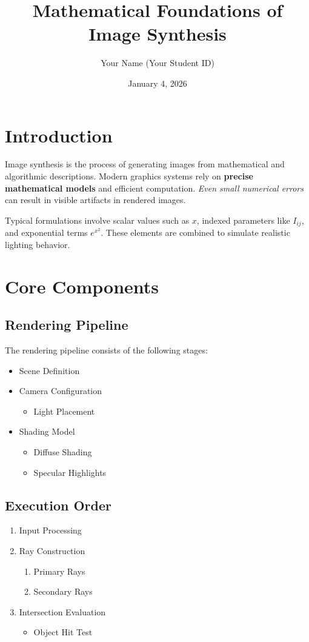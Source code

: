 \documentclass[11pt]{article}
\title{Mathematical Foundations of Image Synthesis}
\author{Your Name (Your Student ID)}
\date{January 4, 2026}
\begin{document}
\maketitle

\section{Introduction}
Image synthesis is the process of generating images from mathematical and
algorithmic descriptions. Modern graphics systems rely on \textbf{precise
mathematical models} and efficient computation. \textit{Even small numerical
errors} can result in visible artifacts in rendered images.

Typical formulations involve scalar values such as $x$, indexed parameters like
$I_{ij}$, and exponential terms $e^{x^2}$. These elements are combined to
simulate realistic lighting behavior.

\section{Core Components}

\subsection{Rendering Pipeline}
The rendering pipeline consists of the following stages:
\begin{itemize}
    \item Scene Definition
    \item Camera Configuration
    \begin{itemize}
        \item Light Placement
    \end{itemize}
    \item[\textbf{Important}] Shading Model
    \begin{itemize}
        \item Diffuse Shading
        \item Specular Highlights
    \end{itemize}
\end{itemize}

\subsection{Execution Order}
\begin{enumerate}
    \item Input Processing
    \item Ray Construction
    \begin{enumerate}
        \item Primary Rays
        \item Secondary Rays
    \end{enumerate}
    \item Intersection Evaluation
    \begin{itemize}
        \item Object Hit Test
    \end{itemize}
\end{enumerate}
\end{document}
